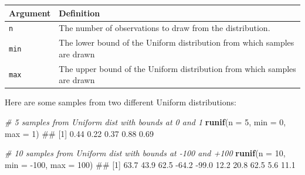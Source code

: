 \documentclass[]{book}
\newenvironment{Shaded}{\begin{snugshade}}{\end{snugshade}}
\newcommand{\KeywordTok}[1]{\textcolor[rgb]{0.13,0.29,0.53}{\textbf{{#1}}}}
\newcommand{\DataTypeTok}[1]{\textcolor[rgb]{0.13,0.29,0.53}{{#1}}}
\newcommand{\DecValTok}[1]{\textcolor[rgb]{0.00,0.00,0.81}{{#1}}}
\newcommand{\CommentTok}[1]{\textcolor[rgb]{0.56,0.35,0.01}{\textit{{#1}}}}
\newcommand{\NormalTok}[1]{{#1}}
\theoremstyle{definition}
\theoremstyle{definition}
\theoremstyle{remark}
\begin{document}
\begin{longtable}[]{@{}ll@{}}
\toprule
\begin{minipage}[b]{0.14\columnwidth}\raggedright\strut
Argument\strut
\end{minipage} & \begin{minipage}[b]{0.61\columnwidth}\raggedright\strut
Definition\strut
\end{minipage}\tabularnewline
\midrule
\endhead
\begin{minipage}[t]{0.14\columnwidth}\raggedright\strut
\texttt{n}\strut
\end{minipage} & \begin{minipage}[t]{0.61\columnwidth}\raggedright\strut
The number of observations to draw from the distribution.\strut
\end{minipage}\tabularnewline
\begin{minipage}[t]{0.14\columnwidth}\raggedright\strut
\texttt{min}\strut
\end{minipage} & \begin{minipage}[t]{0.61\columnwidth}\raggedright\strut
The lower bound of the Uniform distribution from which samples are
drawn\strut
\end{minipage}\tabularnewline
\begin{minipage}[t]{0.14\columnwidth}\raggedright\strut
\texttt{max}\strut
\end{minipage} & \begin{minipage}[t]{0.61\columnwidth}\raggedright\strut
The upper bound of the Uniform distribution from which samples are
drawn\strut
\end{minipage}\tabularnewline
\bottomrule
\end{longtable}

Here are some samples from two different Uniform distributions:

\begin{Shaded}
\begin{Highlighting}[]
\CommentTok{# 5 samples from Uniform dist with bounds at 0 and 1}
\KeywordTok{runif}\NormalTok{(}\DataTypeTok{n =} \DecValTok{5}\NormalTok{, }\DataTypeTok{min =} \DecValTok{0}\NormalTok{, }\DataTypeTok{max =} \DecValTok{1}\NormalTok{)}
\NormalTok{## [1] 0.44 0.22 0.37 0.88 0.69}

\CommentTok{# 10 samples from Uniform dist with bounds at -100 and +100}
\KeywordTok{runif}\NormalTok{(}\DataTypeTok{n =} \DecValTok{10}\NormalTok{, }\DataTypeTok{min =} \NormalTok{-}\DecValTok{100}\NormalTok{, }\DataTypeTok{max =} \DecValTok{100}\NormalTok{)}
\NormalTok{##  [1]  63.7  43.9  62.5 -64.2 -99.0  12.2  20.8  62.5   5.6  11.1}
\end{Highlighting}
\end{Shaded}
\end{document}
